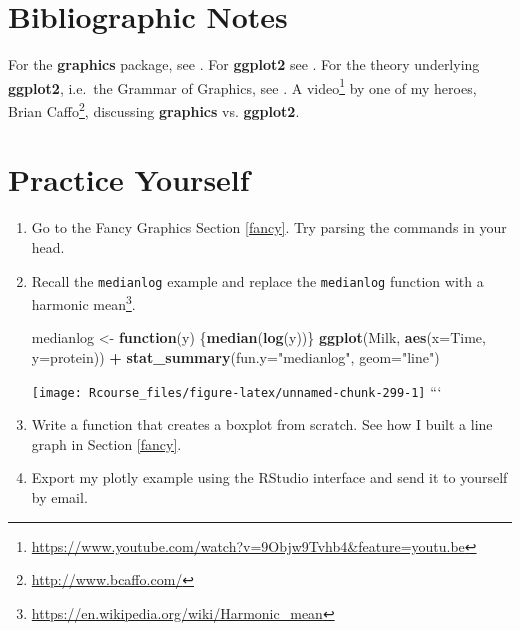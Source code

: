\documentclass[]{book}
\newenvironment{Shaded}{\begin{snugshade}}{\end{snugshade}}
\newcommand{\ControlFlowTok}[1]{\textcolor[rgb]{0.13,0.29,0.53}{\textbf{#1}}}
\newcommand{\DataTypeTok}[1]{\textcolor[rgb]{0.13,0.29,0.53}{#1}}
\newcommand{\KeywordTok}[1]{\textcolor[rgb]{0.13,0.29,0.53}{\textbf{#1}}}
\newcommand{\NormalTok}[1]{#1}
\newcommand{\OperatorTok}[1]{\textcolor[rgb]{0.81,0.36,0.00}{\textbf{#1}}}
\newcommand{\StringTok}[1]{\textcolor[rgb]{0.31,0.60,0.02}{#1}}
\renewcommand{\href}[2]{#2\footnote{\url{#1}}}
\theoremstyle{definition}
\theoremstyle{definition}
\theoremstyle{definition}
\theoremstyle{remark}
\begin{document}
\hypertarget{bibliographic-notes-10}{%
\section{Bibliographic Notes}\label{bibliographic-notes-10}}

For the \textbf{graphics} package, see \citet{Rlanguage}.
For \textbf{ggplot2} see \citet{ggplot2}.
For the theory underlying \textbf{ggplot2}, i.e.~the Grammar of Graphics, see \citet{wilkinson2006grammar}.
A \href{https://www.youtube.com/watch?v=9Objw9Tvhb4\&feature=youtu.be}{video} by one of my heroes, \href{http://www.bcaffo.com/}{Brian Caffo}, discussing \textbf{graphics} vs. \textbf{ggplot2}.

\hypertarget{practice-yourself-8}{%
\section{Practice Yourself}\label{practice-yourself-8}}

\begin{enumerate}
\def\labelenumi{\arabic{enumi}.}
\item
  Go to the Fancy Graphics Section \ref{fancy}. Try parsing the commands in your head.
\item
  Recall the \texttt{medianlog} example and replace the \texttt{medianlog} function with a \href{https://en.wikipedia.org/wiki/Harmonic_mean}{harmonic mean}.

\begin{Shaded}
\begin{Highlighting}[]
\NormalTok{medianlog <-}\StringTok{ }\ControlFlowTok{function}\NormalTok{(y) \{}\KeywordTok{median}\NormalTok{(}\KeywordTok{log}\NormalTok{(y))\}}
\KeywordTok{ggplot}\NormalTok{(Milk, }\KeywordTok{aes}\NormalTok{(}\DataTypeTok{x=}\NormalTok{Time, }\DataTypeTok{y=}\NormalTok{protein)) }\OperatorTok{+}
\StringTok{  }\KeywordTok{stat_summary}\NormalTok{(}\DataTypeTok{fun.y=}\StringTok{"medianlog"}\NormalTok{, }\DataTypeTok{geom=}\StringTok{"line"}\NormalTok{)}
\end{Highlighting}
\end{Shaded}

  \texttt{[image: Rcourse\_files/figure-latex/unnamed-chunk-299-1]}
  ```
\item
  Write a function that creates a boxplot from scratch. See how I built a line graph in Section \ref{fancy}.
\item
  Export my plotly example using the RStudio interface and send it to yourself by email.
\end{enumerate}
\end{document}
